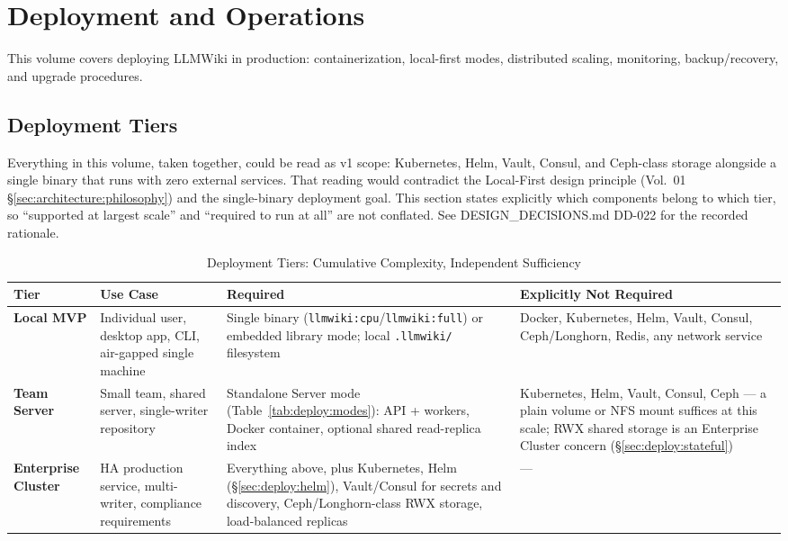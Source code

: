 \chapter{Deployment and Operations}
\label{cha:deployment}

This volume covers deploying LLMWiki in production: containerization, local-first modes, distributed scaling, monitoring, backup/recovery, and upgrade procedures.

\section{Deployment Tiers}
\label{sec:deploy:tiers}

Everything in this volume, taken together, could be read as v1 scope: Kubernetes, Helm, Vault, Consul, and Ceph-class storage alongside a single binary that runs with zero external services. That reading would contradict the Local-First design principle (Vol.~01 \S\ref{sec:architecture:philosophy}) and the single-binary deployment goal. This section states explicitly which components belong to which tier, so ``supported at largest scale'' and ``required to run at all'' are not conflated. See DESIGN\_DECISIONS.md DD-022 for the recorded rationale.

\begin{table}[htbp]
\centering
\caption{Deployment Tiers: Cumulative Complexity, Independent Sufficiency}
\label{tab:deploy:tiers}
\begin{adjustbox}{max width=\textwidth}
\begin{tabular}{p{2.6cm}p{3.6cm}p{4.2cm}p{4.2cm}}
\toprule
\textbf{Tier} & \textbf{Use Case} & \textbf{Required} & \textbf{Explicitly Not Required} \\
\midrule
\textbf{Local MVP} & Individual user, desktop app, CLI, air-gapped single machine & Single binary (\texttt{llmwiki:cpu}/\texttt{llmwiki:full}) or embedded library mode; local \texttt{.llmwiki/} filesystem & Docker, Kubernetes, Helm, Vault, Consul, Ceph/Longhorn, Redis, any network service \\
\textbf{Team Server} & Small team, shared server, single-writer repository & Standalone Server mode (Table~\ref{tab:deploy:modes}): API + workers, Docker container, optional shared read-replica index & Kubernetes, Helm, Vault, Consul, Ceph --- a plain volume or NFS mount suffices at this scale; RWX shared storage is an Enterprise Cluster concern (\S\ref{sec:deploy:stateful}) \\
\textbf{Enterprise Cluster} & HA production service, multi-writer, compliance requirements & Everything above, plus Kubernetes, Helm (\S\ref{sec:deploy:helm}), Vault/Consul for secrets and discovery, Ceph/Longhorn-class RWX storage, load-balanced replicas & --- \\
\bottomrule
\end{tabular}
\end{adjustbox}
\end{table}

